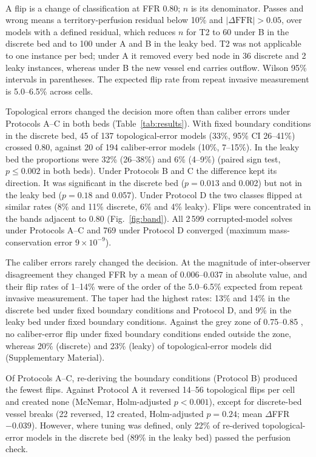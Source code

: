 \documentclass[journal,twoside,web]{ieeecolor}
\begin{document}
\begin{table}[!t]
\begin{tabular}{@{}llrccrcc@{}}
\bottomrule
\end{tabular}
\\[2pt]
\parbox{\textwidth}{\footnotesize A flip is a change of classification at FFR 0.80; $n$ is its denominator. Passes and wrong means a territory-perfusion residual below 10\% and $|\Delta\mathrm{FFR}| > 0.05$, over models with a defined residual, which reduces $n$ for T2 to 60 under B in the discrete
bed and to 100 under A and B in the leaky bed. T2 was not applicable to one instance per bed; under A it removed every bed node in 36 discrete and 2 leaky instances, whereas under B the new vessel end carries outflow. Wilson 95\% intervals in parentheses. The expected flip
rate from repeat invasive measurement is 5.0--6.5\% across cells.}
\end{table}

Topological errors changed the decision more often than caliber errors under Protocols A--C in both beds
(Table~\ref{tab:results}). With fixed boundary conditions in the discrete bed, 45 of 137 topological-error models
(33\%, 95\% CI 26--41\%) crossed 0.80, against 20 of 194 caliber-error models (10\%, 7--15\%). In the leaky bed the
proportions were 32\% (26--38\%) and 6\% (4--9\%) (paired sign test, $p \leq 0.002$ in both beds). Under
Protocols B and C the difference kept its direction. It was significant in the discrete bed
($p = 0.013$ and 0.002) but not in the leaky bed ($p = 0.18$ and 0.057). Under Protocol D the two classes
flipped at similar rates (8\% and 11\% discrete, 6\% and 4\% leaky). Flips were concentrated in the bands adjacent to 0.80 (Fig.~\ref{fig:band}). All 2\,599 corrupted-model solves under Protocols A--C and 769 under Protocol D converged (maximum mass-conservation error $9\times10^{-9}$).

The caliber errors rarely changed the decision. At the magnitude of inter-observer disagreement they changed FFR by
a mean of 0.006--0.037 in absolute value, and their flip rates of 1--14\% were of the order of the 5.0--6.5\%
expected from repeat invasive measurement. The taper had the highest rates: 13\% and 14\% in the discrete bed under fixed boundary
conditions and Protocol D, and 9\% in the leaky bed under fixed boundary conditions. Against the grey zone of 0.75--0.85 \cite{petraco2013}, no caliber-error flip under fixed boundary conditions
ended outside the zone, whereas 20\% (discrete) and 23\% (leaky) of topological-error models did (Supplementary Material).

Of Protocols A--C, re-deriving the boundary conditions (Protocol B) produced the fewest flips. Against Protocol A it reversed 14--56
topological flips per cell and created none (McNemar, Holm-adjusted $p < 0.001$), except for discrete-bed vessel
breaks (22 reversed, 12 created, Holm-adjusted $p = 0.24$; mean $\Delta$FFR $-0.039$). However, where tuning was defined, only 22\% of re-derived topological-error models in the discrete bed (89\% in the leaky bed) passed the perfusion check.
\end{document}
